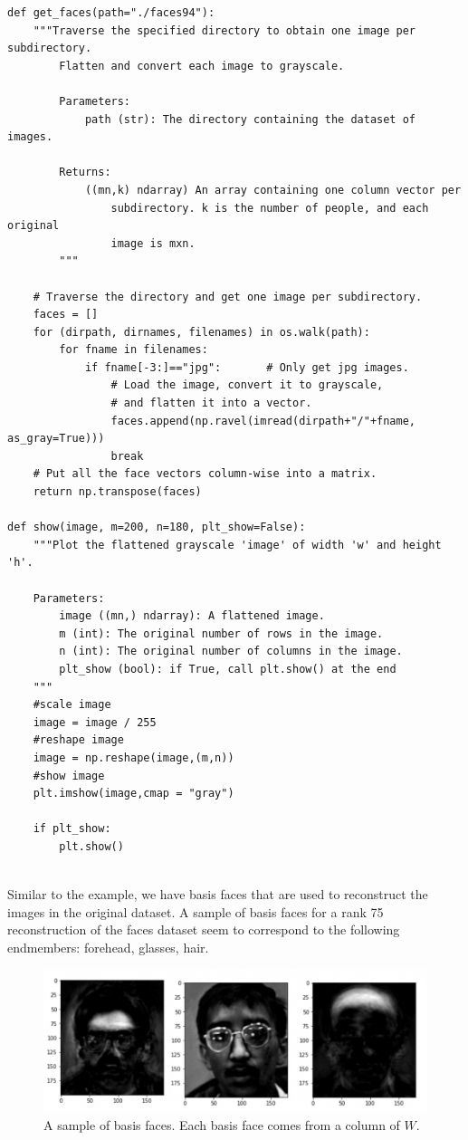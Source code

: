 \begin{lstlisting}
def get_faces(path="./faces94"):
    """Traverse the specified directory to obtain one image per subdirectory. 
        Flatten and convert each image to grayscale.
    
        Parameters:
            path (str): The directory containing the dataset of images.  
    
        Returns:
            ((mn,k) ndarray) An array containing one column vector per
                subdirectory. k is the number of people, and each original
                image is mxn.
        """

    # Traverse the directory and get one image per subdirectory.
    faces = []
    for (dirpath, dirnames, filenames) in os.walk(path):
        for fname in filenames:
            if fname[-3:]=="jpg":       # Only get jpg images.
                # Load the image, convert it to grayscale,
                # and flatten it into a vector.
                faces.append(np.ravel(imread(dirpath+"/"+fname, as_gray=True)))
                break
    # Put all the face vectors column-wise into a matrix.
    return np.transpose(faces)

def show(image, m=200, n=180, plt_show=False):
    """Plot the flattened grayscale 'image' of width 'w' and height 'h'.

    Parameters:
        image ((mn,) ndarray): A flattened image.
        m (int): The original number of rows in the image.
        n (int): The original number of columns in the image.
        plt_show (bool): if True, call plt.show() at the end
    """
    #scale image
    image = image / 255
    #reshape image
    image = np.reshape(image,(m,n))
    #show image
    plt.imshow(image,cmap = "gray")

    if plt_show:
        plt.show()
    
\end{lstlisting}
Similar to the example, we have basis faces that are used to reconstruct the images in the original dataset. 
A sample of basis faces for a rank 75 reconstruction of the faces dataset seem to correspond to the following endmembers: forehead, glasses, hair.

\begin{figure}[H]
\centering
\includegraphics[width=\textwidth]{figures/facial_features.pdf}
\caption{A sample of basis faces.
	      Each basis face comes from a column of $W$.}
\label{fig:basis_faces2}
\end{figure}



